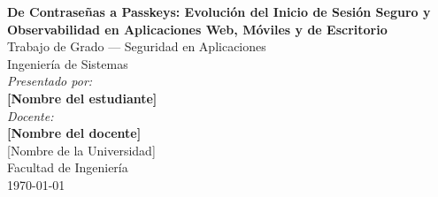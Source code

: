 \documentclass[12pt, a4paper]{article}
\begin{document}

\begin{titlepage}
  \centering
  \vspace*{1.5cm}

  {\LARGE \textbf{De Contraseñas a Passkeys: Evolución del Inicio de Sesión
  Seguro y Observabilidad en Aplicaciones Web, Móviles y de Escritorio}}\\[1.8cm]

  {\large Trabajo de Grado --- Seguridad en Aplicaciones}\\[0.5cm]
  {\large Ingeniería de Sistemas}\\[2.5cm]

  {\normalsize \textit{Presentado por:}}\\[0.4cm]
  {\large \textbf{[Nombre del estudiante]}}\\[2cm]

  {\normalsize \textit{Docente:}}\\[0.4cm]
  {\large \textbf{[Nombre del docente]}}\\[2.5cm]

  {\large [Nombre de la Universidad]}\\[0.3cm]
  {\large Facultad de Ingeniería}\\[1.5cm]

  {\large \today}
  \vfill
\end{titlepage}
\end{document}
